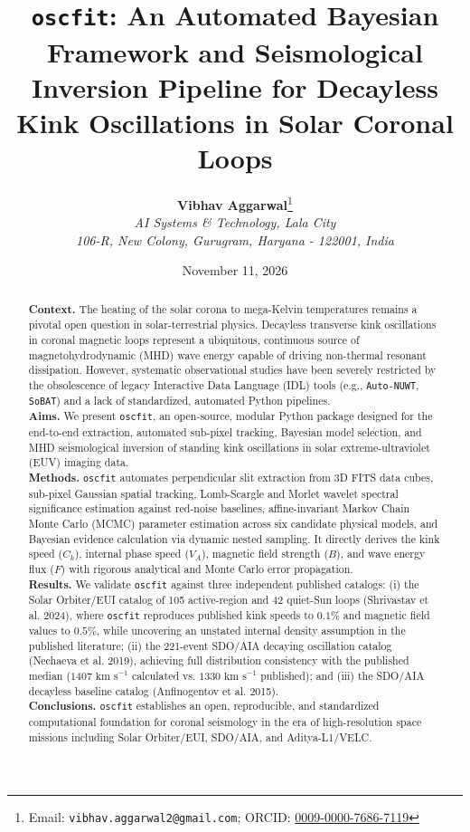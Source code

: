 \documentclass[11pt,a4paper]{article}
\title{\textbf{\LARGE \texttt{oscfit}: An Automated Bayesian Framework and Seismological Inversion Pipeline for Decayless Kink Oscillations in Solar Coronal Loops}}
\author{
    \textbf{Vibhav Aggarwal}\thanks{Email: \texttt{vibhav.aggarwal2@gmail.com}; ORCID: \href{https://orcid.org/0009-0000-7686-7119}{0009-0000-7686-7119}} \\
    \textit{AI Systems \& Technology, Lala City} \\
    \textit{106-R, New Colony, Gurugram, Haryana - 122001, India}
}
\date{November 11, 2026}
\begin{document}
\maketitle

\begin{abstract}
\noindent \textbf{Context.} The heating of the solar corona to mega-Kelvin temperatures remains a pivotal open question in solar-terrestrial physics. Decayless transverse kink oscillations in coronal magnetic loops represent a ubiquitous, continuous source of magnetohydrodynamic (MHD) wave energy capable of driving non-thermal resonant dissipation. However, systematic observational studies have been severely restricted by the obsolescence of legacy Interactive Data Language (IDL) tools (e.g., \texttt{Auto-NUWT}, \texttt{SoBAT}) and a lack of standardized, automated Python pipelines. \\
\textbf{Aims.} We present \texttt{oscfit}, an open-source, modular Python package designed for the end-to-end extraction, automated sub-pixel tracking, Bayesian model selection, and MHD seismological inversion of standing kink oscillations in solar extreme-ultraviolet (EUV) imaging data. \\
\textbf{Methods.} \texttt{oscfit} automates perpendicular slit extraction from 3D FITS data cubes, sub-pixel Gaussian spatial tracking, Lomb-Scargle and Morlet wavelet spectral significance estimation against red-noise baselines, affine-invariant Markov Chain Monte Carlo (MCMC) parameter estimation across six candidate physical models, and Bayesian evidence calculation via dynamic nested sampling. It directly derives the kink speed ($C_k$), internal phase speed ($V_A$), magnetic field strength ($B$), and wave energy flux ($F$) with rigorous analytical and Monte Carlo error propagation. \\
\textbf{Results.} We validate \texttt{oscfit} against three independent published catalogs: (i) the Solar Orbiter/EUI catalog of 105 active-region and 42 quiet-Sun loops (Shrivastav et al. 2024), where \texttt{oscfit} reproduces published kink speeds to $0.1\%$ and magnetic field values to $0.5\%$, while uncovering an unstated internal density assumption in the published literature; (ii) the 221-event SDO/AIA decaying oscillation catalog (Nechaeva et al. 2019), achieving full distribution consistency with the published median ($1407\text{ km s}^{-1}$ calculated vs. $1330\text{ km s}^{-1}$ published); and (iii) the SDO/AIA decayless baseline catalog (Anfinogentov et al. 2015). \\
\textbf{Conclusions.} \texttt{oscfit} establishes an open, reproducible, and standardized computational foundation for coronal seismology in the era of high-resolution space missions including Solar Orbiter/EUI, SDO/AIA, and Aditya-L1/VELC.
\end{abstract}
\end{document}
